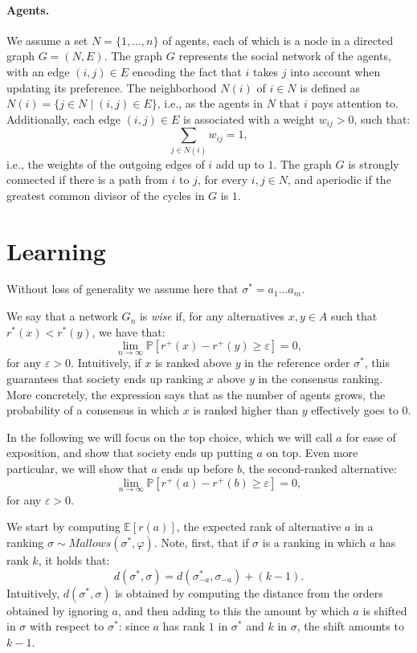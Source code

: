 \documentclass{article}
\theoremstyle{definition}
\renewcommand{\phi}{\varphi}
\renewcommand{\epsilon}{\varepsilon}
\newcommand{\PR}{\mathbb{P}}
\newcommand{\EX}{\mathbb{E}}
\begin{document}
    \paragraph{Agents.} 
    We assume a set \(N = \{1,\dots, n\}\) of agents,
    each of which is a node in a directed graph \(G = (N,E)\). 
    The graph \(G\) represents the social network of the agents, with an edge 
    \((i,j)\in E\) encoding the fact that \(i\) takes \(j\) into account when updating its preference.
    The neighborhood \(N(i)\) of \(i\in N\) is defined as \(N(i) = \{j\in N\mid (i,j)\in E\}\), 
    i.e., as the agents in \(N\) that \(i\) pays attention to.
    Additionally, each edge \((i,j)\in E\) is associated with a weight \(w_{ij}>0\), such that:
    \[
      \sum_{j\in N(i)}w_{ij} = 1,
    \]
    i.e., the weights of the outgoing edges of \(i\) add up to \(1\).
    The graph \(G\) is strongly connected if there is a path from \(i\) to \(j\), for every \(i,j\in N\), 
    and aperiodic if the greatest common divisor of the cycles in \(G\) is \(1\).
    


    \section{Learning}
    Without loss of generality we assume here that \(\sigma^* = a_1\dots a_m\). 

    We say that a network \(G_n\) is \emph{wise} if, for any alternatives \(x, y\in A\)
    such that \(r^*(x)<r^*(y)\), we have that:
    \[
      \lim_{n\rightarrow \infty}\PR[r^+(x) - r^+(y)\ge \epsilon] = 0,
    \]
    for any \(\epsilon>0\).
    Intuitively, if \(x\) is ranked above \(y\) in the reference order \(\sigma^*\), 
    this guarantees that society ends up ranking \(x\) above \(y\) in the consensus ranking.
    More concretely, the expression says that as the number of agents grows, the probability 
    of a consensus in which \(x\) is ranked higher than \(y\) effectively goes to \(0\).
    
    In the following we will focus on the top choice, which we will call \(a\) for ease of exposition,
    and show that society ends up putting \(a\) on top. Even more particular, we will show that 
    \(a\) ends up before \(b\), the second-ranked alternative:
    \[
      \lim_{n\rightarrow \infty}\PR[r^+(a) - r^+(b)\ge \epsilon] = 0,
    \]
    for any \(\epsilon>0\).

    We start by computing \(\EX[r(a)]\), the expected rank of alternative \(a\) in a ranking 
    \(\sigma\sim\textit{Mallows}(\sigma^*,\phi)\).
    Note, first, that if \(\sigma\) is a ranking in which \(a\) has rank \(k\), it holds that:
    \[
      d(\sigma^*,\sigma) = d(\sigma^*_{-a}, \sigma_{-a}) + (k-1).
    \]
    Intuitively, \(d(\sigma^*,\sigma)\) is obtained by computing the distance from the orders
    obtained by ignoring \(a\), and then adding to this the amount by which \(a\) is shifted in \(\sigma\)
    with respect to \(\sigma^*\): since \(a\) has rank \(1\) in \(\sigma^*\) and \(k\) in \(\sigma\), 
    the shift amounts to \(k-1\).
\end{document}

